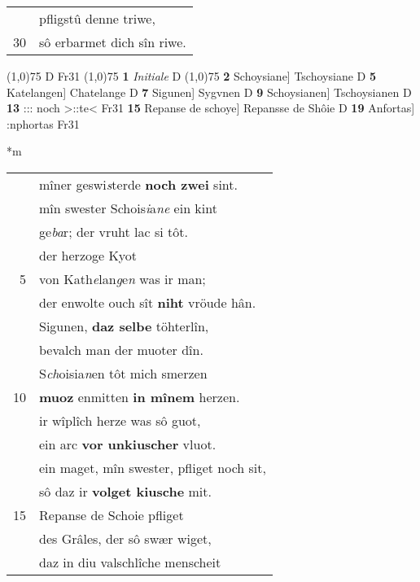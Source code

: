 \documentclass[8pt,a4paper,notitlepage]{article}
\begin{document}
\begin{table}[ht]
\begin{minipage}[t]{0.5\linewidth}
\begin{tabular}{rl}
 & pfligstû denne triwe,\\ 
30 & sô erbarmet dich sîn riwe.\\ 
\end{tabular}
\scriptsize
\line(1,0){75} \newline
D Fr31 \newline
\line(1,0){75} \newline
\textbf{1} \textit{Initiale} D  \newline
\line(1,0){75} \newline
\textbf{2} Schoysiane] Tschoysiane D \textbf{5} Katelangen] Chatelange D \textbf{7} Sigunen] Sygvnen D \textbf{9} Schoysianen] Tschoysianen D \textbf{13} ::: noch >::te< Fr31 \textbf{15} Repanse de schoye] Repansse de Shôie D \textbf{19} Anfortas] :nphortas Fr31 \newline
\end{minipage}
\hspace{0.5cm}
\begin{minipage}[t]{0.5\linewidth}
\small
\begin{center}*m
\end{center}
\begin{tabular}{rl}
 & mîner geswi\textit{s}terde \textbf{noch zwei} sint.\\ 
 & mîn swester Schois\textit{i}a\textit{ne} ein kint\\ 
 & ge\textit{ba}r; der vruht lac si tôt.\\ 
 & der herzoge Kyot\\ 
5 & von Kath\textit{e}lan\textit{g}e\textit{n} was ir man;\\ 
 & der enwolte ouch sît \textbf{niht} vröude hân.\\ 
 & Sigunen, \textbf{daz selbe} töhterlîn,\\ 
 & bevalch man der muoter dîn.\\ 
 & S\textit{ch}oisia\textit{n}en tôt mich smerzen\\ 
10 & \textbf{muoz} enmitten \textbf{in mînem} herzen.\\ 
 & ir wîplîch herze was sô guot,\\ 
 & ein arc \textbf{vor unkiuscher} vluot.\\ 
 & ein maget, mîn swester, pfliget noch sit,\\ 
 & sô daz ir \textbf{volget kiusche} mit.\\ 
15 & Repanse de Schoie pfliget\\ 
 & des Grâles, der sô swær wiget,\\ 
 & daz in diu valschlîche menscheit\\ 

\end{tabular}
\end{minipage}
\end{table}
\end{document}
